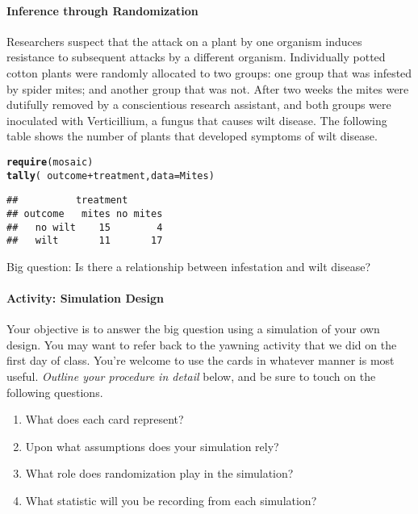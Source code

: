 \documentclass[10pt]{article}\usepackage[]{graphicx}\usepackage[]{color}
\makeatletter
\newcommand{\hlopt}[1]{\textcolor[rgb]{0,0,0}{#1}}%
\newcommand{\hlstd}[1]{\textcolor[rgb]{0.345,0.345,0.345}{#1}}%
\newcommand{\hlkwc}[1]{\textcolor[rgb]{0.333,0.667,0.333}{#1}}%
\newcommand{\hlkwd}[1]{\textcolor[rgb]{0.737,0.353,0.396}{\textbf{#1}}}%
\newenvironment{kframe}{%
 \def\at@end@of@kframe{}%
 \ifinner\ifhmode%
  \def\at@end@of@kframe{\end{minipage}}%
  \begin{minipage}{\columnwidth}%
 \fi\fi%
 \def\FrameCommand##1{\hskip\@totalleftmargin \hskip-\fboxsep
 \colorbox{shadecolor}{##1}\hskip-\fboxsep
     \hskip-\linewidth \hskip-\@totalleftmargin \hskip\columnwidth}%
 \MakeFramed {\advance\hsize-\width
   \@totalleftmargin\z@ \linewidth\hsize
   \@setminipage}}%
 {\par\unskip\endMakeFramed%
 \at@end@of@kframe}
\newenvironment{knitrout}{}{} %
\makeatother
\begin{document}
\paragraph{Inference through Randomization}

Researchers suspect that the attack on a plant by one organism induces resistance to subsequent attacks by a different organism.  Individually potted cotton plants were randomly allocated to two groups: one group that was infested by spider mites; and another group that was not.  After two weeks the mites were dutifully removed by a conscientious research assistant, and both groups were inoculated with Verticillium, a fungus that causes wilt disease.  
The following table shows the number of plants that developed symptoms of wilt disease.

\begin{knitrout}
\color{fgcolor}\begin{kframe}
\begin{alltt}
\hlkwd{require}\hlstd{(mosaic)}
\hlkwd{tally}\hlstd{(}\hlopt{~} \hlstd{outcome} \hlopt{+} \hlstd{treatment,} \hlkwc{data} \hlstd{= Mites)}
\end{alltt}
\begin{verbatim}
##          treatment
## outcome   mites no mites
##   no wilt    15        4
##   wilt       11       17
\end{verbatim}
\end{kframe}
\end{knitrout}

Big question: Is there a relationship between infestation and wilt disease? 

\paragraph{Activity: Simulation Design}

Your objective is to answer the big question using a simulation of your own design.  You may want to refer back to the yawning activity that we did on the first day of class.  You're welcome to use the cards in whatever manner is most useful.  \emph{Outline your procedure in detail} below, and be sure to touch on the following questions.

\begin{enumerate}
  \itemsep1in
  \item What does each card represent?
  \item Upon what assumptions does your simulation rely?
  \item What role does randomization play in the simulation?
  \item What statistic will you be recording from each simulation?
\end{enumerate}
\end{document}

